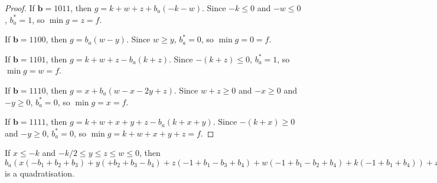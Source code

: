 \documentclass[11pt]{scrartcl}
\newcommand{\vc}[1]{\boldsymbol{#1}}
\begin{document}
\begin{proof}
If $\vc b = 1011$, then $g = k + w + z + b_a(-k - w)$. Since $- k \le 0$ and $-w \le 0$, $b_a^*= 1$, so $\min g = z = f$.

If $\vc b = 1100$, then $g = b_a(w - y)$. Since $w \ge y$, $b_a^*= 0$, so $\min g = 0 = f$.

If $\vc b = 1101$, then $g = k + w + z - b_a(k + z)$. Since $-(k + z) \le 0$, $b_a^*= 1$, so $\min g = w = f$.

If $\vc b = 1110$, then $g = x + b_a(w - x - 2y + z)$. Since $w + z \ge 0$ and $-x \ge 0$ and $-y \ge 0$, $b_a^* = 0$, so $\min g = x = f$.

If $\vc b = 1111$, then $g = k + w + x + y + z - b_a(k + x + y)$. Since $-(k + x) \ge 0$ and $-y \ge 0$, $b_a^*= 0$, so $\min g = k+w+x+y+z = f$.

\end{proof}

\begin{lemma}
	If  $x\le -k$ and $-k/2\le y \le z \le w \le 0$, then 
$b_a(x(-b_1+b_2+b_3)+y(+b_2+b_3-b_4)+z(-1+b_1-b_3+b_4)+w(-1+b_1-b_2+b_4)+k(-1+b_1+b_4))+x(-b_2-b_3+b_1b_2+b_1b_3)+y(-b_2-b_3+b_2b_4+b_3b_4)+z(+1-b_1+b_3-b_4+b_1b_4)+w(+1-b_1+b_2-b_4+b_1b_4)+k(+1-b_1-b_4+b_1b_4)$
	is a quadratisation.

\end{lemma}
\end{document}
